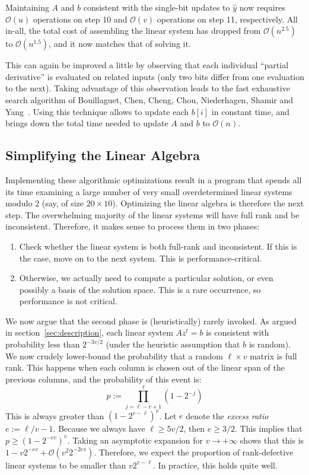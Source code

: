 \documentclass[a4paper,UKenglish,cleveref, autoref]{lipics-v2019}
\newcommand{\bigO}[1]{\ensuremath{\mathcal{O}\left( #1 \right)} }
\begin{document}
Maintaining $A$ and $b$ consistent with the single-bit updates to $\hat y$ now
requires $\bigO{u}$ operations on step 10 and $\bigO{v}$ operations on step
11, respectively. All in-all, the total cost of assembling the linear system has dropped from
$\bigO{n^{2.5}}$ to $\bigO{n^{1.5}}$, and it now matches that of solving it.

This can again be improved a little by observing that each individual ``partial
derivative'' is evaluated on related inputs (only two bits differ from one
evaluation to the next). Taking advantage of this observation leads to the fast
exhaustive search algorithm of Bouillaguet, Chen, Cheng, Chou, Niederhagen,
Shamir and Yang~\cite{BouillaguetCCCNSY10}. Using this technique allows to
update each $b[i]$ in constant time, and brings down the total time needed to
update $A$ and $b$ to $\bigO{n}$.

\subsection{Simplifying the Linear Algebra}

Implementing these algorithmic optimizations result in a program that spends all
its time examining a large number of very small overdetermined linear systems
modulo 2 (say, of size $20 \times 10$). Optimizing the linear algebra is
therefore the next step. The overwhelming majority of the linear systems will
have full rank and be inconsistent. Therefore, it makes sense to process them in
two phases:
\begin{enumerate}
  \item Check whether the linear system is both full-rank and inconsistent. If
  this is the case, move on to the next system. This is performance-critical.
  \item Otherwise, we actually need to compute a particular solution, or even
  possibly a basis of the solution space. This is a rare occurrence, so
  performance is not critical.
\end{enumerate}

We now argue that the second phase is (heuristically) rarely invoked.  As argued
in section~\ref{sec:description}, each linear system $Az^t = b$ is consistent
with probability less than $2^{-3v/2}$ (under the heuristic assumption that $b$
is random). We now crudely lower-bound the probability that a random
$\ell \times v$ matrix is full rank. This happens when each column is chosen out
of the linear span of the previous columns, and the probability of this event
is:
\[
p := \prod_{j=\ell-v+1}^\ell \left(1 - 2^{-j} \right)
\]
This is always greater than $\left(1 - 2^{v-\ell} \right)^v$. Let $e$ denote the
\emph{excess ratio} $e := \ell/v - 1$. Because we always have $\ell \geq 5v/2$,
then $e \geq 3/2$. This implies that $p \geq \left(1 - 2^{-ev} \right)^v$. Taking
an asymptotic expansion for $v \rightarrow +\infty$ shows that this is
$1 - v 2^{-ev} + \bigO{v^2 2^{-2ev}}$. Therefore, we expect the proportion of
rank-defective linear systems to be smaller than $v 2^{v-\ell}$. In practice,
this holds quite well.
\end{document}
